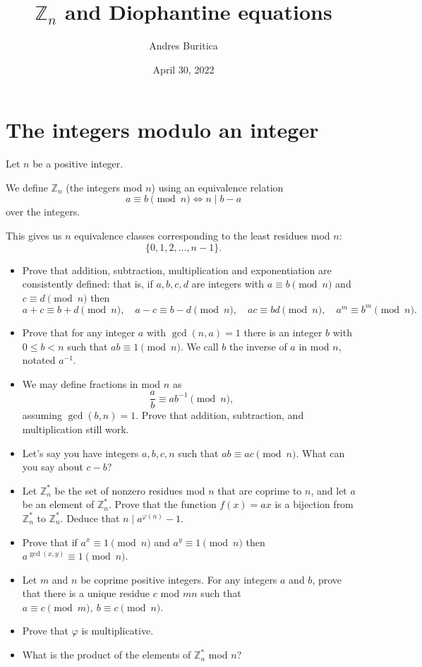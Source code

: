 \documentclass{article}
\title{$\mathbb Z_n$ and Diophantine equations}
\author{Andres Buritica}
\date{April 30, 2022}
\begin{document}
\maketitle
\section{The integers modulo an integer}
  Let $n$ be a positive integer.

  We define $\mathbb Z_n$ (the integers mod $n$) using an equivalence relation
  \[a\equiv b\pmod n\iff n\mid b-a\]
  over the integers.

  This gives us $n$ equivalence classes corresponding to the least residues mod
  $n$: \[\{0,1,2,\ldots,n-1\}.\]
  \begin{itemize}
    \item Prove that addition, subtraction, multiplication and exponentiation
      are consistently defined: that
      is, if $a,b,c,d$ are integers with $a\equiv b\pmod n$ and $c\equiv d\pmod
      n$ then \[a+c\equiv b+d\pmod n,\quad a-c\equiv b-d\pmod n,\quad ac\equiv
        bd\pmod n,\quad a^m\equiv b^m\pmod n.\]
    \item Prove that for any integer $a$ with $\gcd(n,a)=1$ there is an integer $b$
      with $0\le b<n$ such that $ab\equiv 1\pmod n$. We call $b$ the inverse of
      $a$ in mod $n$, notated $a^{-1}$.
    \item We may define fractions in mod $n$ as \[\frac ab\equiv ab^{-1}\pmod n,\]
      assuming $\gcd(b,n)=1$. Prove that addition, subtraction, and
      multiplication still work.
    \item Let's say you have integers $a,b,c,n$ such that $ab\equiv ac\pmod n$.
      What can you say about $c-b$?
    \item Let $\mathbb Z_n^*$ be the set of nonzero residues mod $n$ that are
      coprime to $n$, and let $a$ be an
      element of $\mathbb Z_n^*$. Prove that the function $f(x)=ax$ is a
      bijection from $\mathbb Z_n^*$ to $\mathbb Z_n^*$. Deduce that $n\mid
      a^{\varphi(n)}-1$.
    \item Prove that if $a^x\equiv 1\pmod n$ and $a^y\equiv 1\pmod n$ then
      $a^{\gcd(x,y)}\equiv 1\pmod n$.
    \item Let $m$ and $n$ be coprime positive integers. For any integers $a$ and
      $b$, prove that there is a unique residue $c$ mod $mn$ such that $a\equiv
      c\pmod m,\ b\equiv c\pmod n$.
    \item Prove that $\varphi$ is multiplicative.
    \item What is the product of the elements of $\mathbb Z_n^*$ mod $n$?
  \end{itemize}
  \newpage
\end{document}
